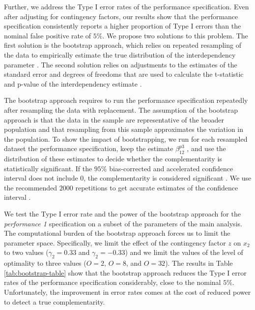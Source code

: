 \documentclass[12pt]{article}
\begin{document}
Further, we address the Type I error rates of the performance specification. Even after adjusting for contingency factors, our results show that the performance specification consistently reports a higher proportion of Type I errors than the nominal false positive rate of $5\%$. We propose two solutions to this problem. The first solution is the bootstrap approach, which relies on repeated resampling of the data to empirically estimate the true distribution of the interdependency parameter \citep{efron_computer_2017}. The second solution relies on adjustments to the estimates of the standard error and degrees of freedoms that are used to calculate the t-statistic and p-value of the interdependency estimate \citep{young_improved_2016}.

The bootstrap approach requires to run the performance specification repeatedly after resampling the data with replacement. The assumption of the bootstrap approach is that the data in the sample are representative of the broader population and that resampling from this sample approximates the variation in the population. To show the impact of bootstrapping, we run for each resampled dataset the performance specification, keep the estimate $\beta_{12}^{p3}$ , and use the distribution of these estimates to decide whether the complementarity is statistically significant. If the $95\%$ bias-corrected and accelerated confidence interval does not include $0$, the complementarity is considered significant \citep{efron_computer_2017}. We use the recommended $2000$ repetitions to get accurate estimates of the confidence interval \citep{efron_computer_2017}. 

We test the Type I error rate and the power of the bootstrap approach for the \emph{performance 1} specification on a subset of the parameters of the main analysis. The computational burden of the bootstrap approach forces us to limit the parameter space. Specifically, we limit the effect of the contingency factor $z$ on $x_2$ to two values ($\gamma_2 = 0.33$ and $\gamma_2 = -0.33$) and we limit the values of the level of optimality to three values ($O=2$, $O=8$, and $O=32$). The results in Table \ref{tab:bootstrap-table} show that the bootstrap approach reduces the Type I error rates of the performance specification considerably, close to the nominal $5\%$.  Unfortunately, the improvement in error rates comes at the cost of reduced power to detect a true complementarity.


\end{document}
